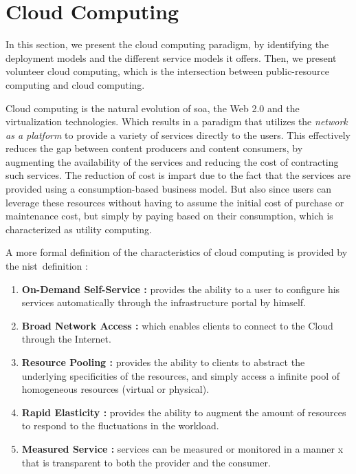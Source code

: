 \documentclass[12pt, titlepage]{uo_temp}
\begin{document}
     \section{Cloud Computing}
     In this section, we present the cloud computing paradigm, by identifying the
     deployment models and the different service models it offers. Then, we present
     volunteer cloud computing, which is the intersection between public-resource
     computing and cloud computing.  

     Cloud computing is the natural evolution of \gls{soa}, the Web
     2.0 and the virtualization technologies. Which results in a paradigm that utilizes
     the \emph{network as a platform} to provide a variety of services directly to the
     users. This effectively reduces the gap between content producers and content consumers,
     by augmenting the availability of the services and reducing the cost of contracting
     such services. The reduction of cost is impart due to the fact that the services are
     provided using a consumption-based business model. But also since users can leverage
     these resources without having to assume the initial cost of purchase or maintenance
     cost, but simply by paying based on their consumption, which is characterized as
     utility computing. 

     A more formal definition of the characteristics of cloud computing is provided by the
     \gls{nist}\ definition \cite{nist}:
     \begin{enumerate}
     \item \textbf{On-Demand Self-Service :} provides the ability to a user to configure his
       services automatically through the infrastructure portal by himself.
     \item \textbf{Broad Network Access :} which enables clients to connect to the Cloud
       through the Internet.
     \item \textbf{Resource Pooling :} provides the ability to clients to abstract the
       underlying specificities of the resources, and simply access a infinite pool of
       homogeneous resources (virtual or physical).
     \item \textbf{Rapid Elasticity :} provides the ability to augment the amount of
       resources to respond to the fluctuations in the workload.
     \item \textbf{Measured Service :} services can be measured or monitored in a manner
x       that is transparent to both the provider and the consumer.
     \end{enumerate}
     
\end{document}
